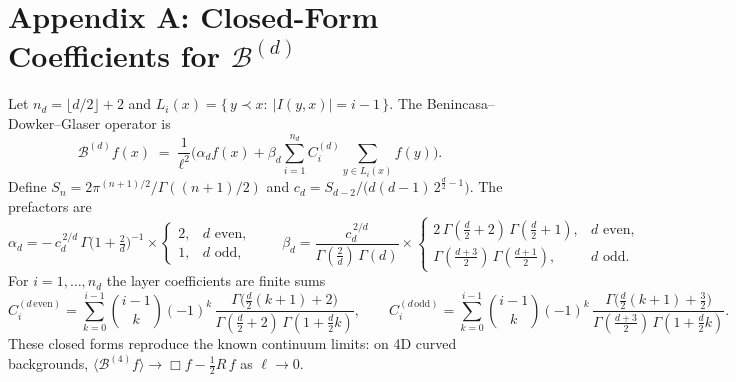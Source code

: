 \documentclass[12pt]{article}
\theoremstyle{definition}
\newcommand{\Boxd}{\mathcal{B}} %
\begin{document}
\section*{Appendix A: Closed-Form Coefficients for $\Boxd^{(d)}$}
Let $n_d=\lfloor d/2\rfloor+2$ and $L_i(x)=\{\,y\prec x:\ |I(y,x)|=i-1\,\}$. The Benincasa--Dowker--Glaser operator is
\[
\Boxd^{(d)} f(x) \;=\; \frac{1}{\ell^2}\Big( \alpha_d f(x) + \beta_d \sum_{i=1}^{n_d} C^{(d)}_i \sum_{y\in L_i(x)} f(y) \Big).
\]
Define $S_n=2\pi^{(n+1)/2}/\Gamma((n+1)/2)$ and $c_d = S_{d-2}/\!\bigl(d(d-1)\,2^{\frac d2-1}\bigr)$. The prefactors are
\[
\alpha_d = -\,c_d^{\,2/d}\,\Gamma\!\Big(1+\tfrac{2}{d}\Big)^{-1}\!\times
\begin{cases}
2, & d\text{ even},\\[2pt]
1, & d\text{ odd},
\end{cases}
\qquad
\beta_d = \frac{c_d^{\,2/d}}{\Gamma(\tfrac{2}{d})\,\Gamma(d)}\times
\begin{cases}
2\,\Gamma(\tfrac d2+2)\,\Gamma(\tfrac d2+1), & d\text{ even},\\[2pt]
\Gamma(\tfrac{d+3}{2})\,\Gamma(\tfrac{d+1}{2}), & d\text{ odd}.
\end{cases}
\]
For $i=1,\dots,n_d$ the layer coefficients are finite sums
\[
C^{(d\,\mathrm{even})}_i = \sum_{k=0}^{i-1} \binom{i-1}{k} (-1)^k \,
\frac{\Gamma\!\bigl( \tfrac d2(k+1)+2\bigr)}{\Gamma(\tfrac d2+2)\,\Gamma(1+\tfrac d2 k)},
\qquad
C^{(d\,\mathrm{odd})}_i = \sum_{k=0}^{i-1} \binom{i-1}{k} (-1)^k \,
\frac{\Gamma\!\bigl( \tfrac d2(k+1)+\tfrac{3}{2}\bigr)}{\Gamma(\tfrac{d+3}{2})\,\Gamma(1+\tfrac d2 k)}.
\]
These closed forms reproduce the known continuum limits: on 4D curved backgrounds,
$\big\langle \Boxd^{(4)} f\big\rangle \to \Box f - \tfrac12 R\,f$ as $\ell\to 0$.



\end{document}
